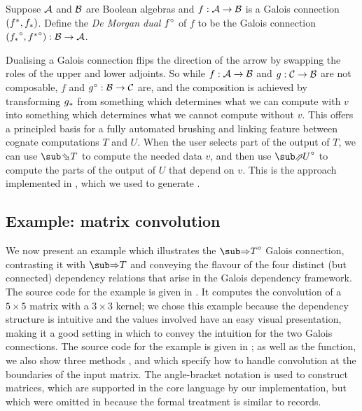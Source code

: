 \begin{definition}
   Suppose $\mathcal{A}$ and $\mathcal{B}$ are Boolean algebras and $f: \mathcal{A} \to \mathcal{B}$ is a Galois connection $({f}^*,{f}_*)$. Define the \emph{De Morgan dual} ${f}^{\circ}$ of $f$ to be the Galois connection $({{f}_*}^{\circ}, {{f}^*}^{\circ}): \mathcal{B} \to \mathcal{A}$.
\end{definition}

\noindent Dualising a Galois connection flips the direction of the arrow by swapping the roles of the upper and lower adjoints. So while $f: \mathcal{A} \to \mathcal{B}$ and $g: \mathcal{C} \to \mathcal{B}$ are not composable, $f$ and ${g}^{\circ}: \mathcal{B} \to \mathcal{C}$ are, and the composition is achieved by transforming ${g}_*$ from something which determines what we can compute with $v$ into something which determines what we cannot compute without $v$. This offers a principled basis for a fully automated brushing and linking feature between cognate computations $T$ and $U$. When the user selects part of the output of $T$, we can use $\evalBwdF{T}$ to compute the needed data $v$, and then use $\dual{\evalFwdF{U}}$ to compute the parts of the output of $U$ that depend on $v$. This is the approach implemented in \OurLanguage, which we used to generate .

\subsection{Example: matrix convolution}

We now present an example which illustrates the $\dual{\evalGC{T}}$ Galois connection, contrasting it with $\evalGC{T}$ and conveying the flavour of the four distinct (but connected) dependency relations that arise in the Galois dependency framework. The source code for the example is given in . It computes the convolution of a $5 \times 5$ matrix with a $3 \times 3$ kernel; we chose this example because the dependency structure is intuitive and the values involved have an easy visual presentation, making it a good setting in which to convey the intuition for the two Galois connections. The source code for the example is given in ; as well as the  function, we also show three methods ,  and  which specify how to handle convolution at the boundaries of the input matrix. The angle-bracket notation is used to construct matrices, which are supported in the core language by our implementation, but which were omitted in  because the formal treatment is similar to records.

